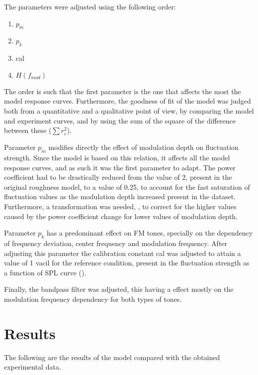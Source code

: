 \documentclass[../main.tex]{subfiles}
\begin{document}
\begin{modelchapter}
The parameters were adjusted using the following order:
\begin{enumerate}
  \item $p_m$
  \item $p_k$
  \item cal
  \item $H(f_{mod})$
\end{enumerate}

The order is such that the first parameter is the one that affects the most the
model response curves. Furthermore, the goodness of fit of the model was judged
both from a quantitative and a qualitative point of view, by comparing the model
and experiment curves, and by using the sum of the square of the difference
between these ($\sum r_i^2$).

Parameter $p_m$ modifies directly the effect of modulation depth on fluctuation
strength. Since the model is based on this relation, it affects all the model
response curves, and as such it was the first parameter to adapt. The power
coefficient had to be drastically reduced from the value of 2, present in the
original roughness model, to a value of 0.25, to account for the fast saturation
of fluctuation values as the modulation depth increased present in the dataset.
Furthermore, a transformation was needed,
, to correct for the higher
values caused by the power coefficient change for lower values of
modulation depth.

Parameter $p_k$ has a predominant effect on \gls{FM} tones, specially on the
dependency of frequency deviation, center frequency and modulation frequency.
After adjusting this parameter the calibration constant cal was adjusted to
attain a value of 1 vacil for the reference condition, present in the
fluctuation strength as a function of \gls{SPL} curve
().

Finally, the bandpass filter was adjusted, this having a effect mostly on the
modulation frequency dependency for both types of tones.

\section{Results}

The following are the results of the model compared with the obtained
experimental data.



\end{modelchapter}
\end{document}
